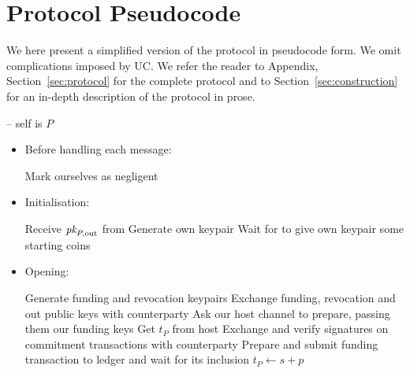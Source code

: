 \section{Protocol Pseudocode}
\label{sec:pseudocode}

We here present a simplified version of the protocol in pseudocode form. We omit
complications imposed by UC. We refer the reader to Appendix,
Section~\ref{sec:protocol} for the complete protocol and to
Section~\ref{sec:construction} for an in-depth description of the protocol in
prose.
\ \\

\begin{center}
  \begin{processbox}{\pchan -- self is $P$}
    \begin{itemize}
      \item Before handling each message:
      \begin{algorithmic}[0]
          \State Mark ourselves as negligent 
        \EndIf
      \end{algorithmic}

      \item Initialisation:
      \begin{algorithmic}[0]
        \State Receive $\textit{pk}_{P, \mathrm{out}}$ from \environment{} 
        \State Generate own keypair
        \State Wait for \environment to give own keypair some starting coins
      \end{algorithmic}

      \item Opening:
      \begin{algorithmic}[0]
        \State Generate funding and revocation keypairs
        \State Exchange funding, revocation and out public keys with
        counterparty
          \State Ask our host channel to prepare, passing them our funding keys
          \State Get $t_P$ from host 
        \EndIf
        \State Exchange and verify signatures on commitment transactions with
        counterparty
          \State Prepare and submit funding transaction to ledger and wait for
          its inclusion 
          \State $t_P \gets s + p$ 
        \EndIf
      \end{algorithmic}


\end{itemize}
\end{processbox}
\end{center}
